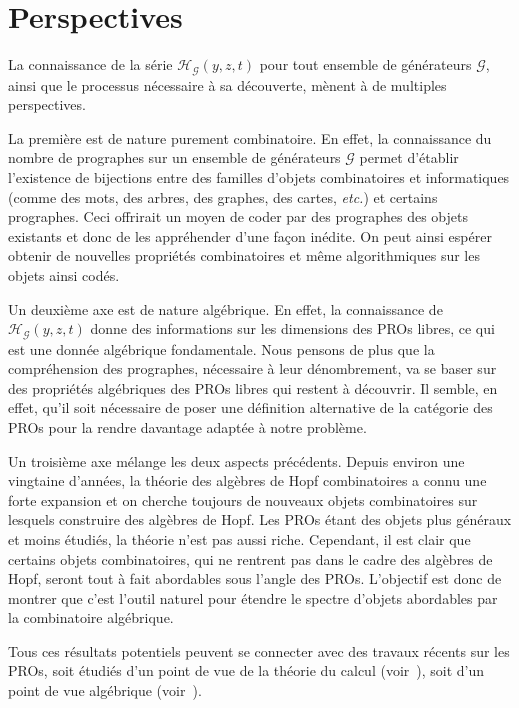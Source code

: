 \documentclass[10pt,reqno]{amsart}
\numberwithin{equation}{subsection}
\newcommand{\Hilbert}{\mathcal{H}}
\newcommand{\Gen}{\mathcal{G}}
\begin{document}
\section{Perspectives}
La connaissance de la série $\Hilbert_{\Gen}(y, z, t)$ pour tout ensemble
de générateurs $\Gen$, ainsi que le processus nécessaire à sa découverte,
mènent à de multiples perspectives.

La première est de nature purement combinatoire. En effet, la connaissance
du nombre de prographes sur un ensemble de générateurs $\Gen$ permet
d'établir l'existence de bijections entre des familles d'objets
combinatoires et informatiques (comme des mots, des arbres, des graphes,
des cartes, {\em etc.}) et certains prographes. Ceci offrirait un moyen
de coder par des prographes des objets existants et donc de les
appréhender d'une façon inédite. On peut ainsi espérer obtenir de
nouvelles propriétés combinatoires et même algorithmiques sur les objets
ainsi codés.

Un deuxième axe est de nature algébrique. En effet, la connaissance de
$\Hilbert_{\Gen}(y, z, t)$ donne des informations sur les dimensions
des PROs libres, ce qui est une donnée algébrique fondamentale. Nous
pensons de plus que la compréhension des prographes, nécessaire à
leur dénombrement, va se baser sur des propriétés algébriques des
PROs libres qui restent à découvrir. Il semble, en effet, qu'il soit
nécessaire de poser une définition alternative de la catégorie des
PROs pour la rendre davantage adaptée à notre problème.

Un troisième axe mélange les deux aspects précédents. Depuis environ une
vingtaine d'années, la théorie des algèbres de Hopf combinatoires a connu
une forte expansion et on cherche toujours de nouveaux objets
combinatoires sur lesquels construire des algèbres de Hopf. Les PROs
étant des objets plus généraux et moins étudiés, la théorie n'est pas
aussi riche. Cependant, il est clair que certains objets combinatoires,
qui ne rentrent pas dans le cadre des algèbres de Hopf, seront tout à fait
abordables sous l'angle des PROs. L'objectif est donc de montrer que
c'est l'outil naturel pour étendre le spectre d'objets abordables par la
combinatoire algébrique.

Tous ces résultats potentiels peuvent se connecter avec des travaux
récents sur les PROs, soit étudiés d'un point de vue de la théorie du
calcul (voir~\cite{Laf03}), soit d'un point de vue algébrique
(voir~\cite{Val07}).
\end{document}
